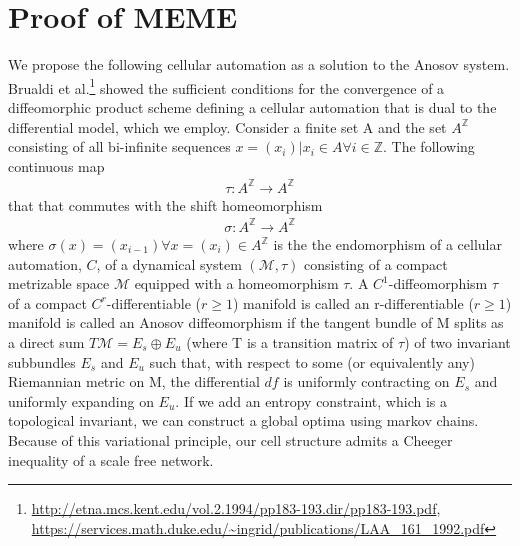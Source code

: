 \documentclass{article}
\begin{document}
\section{Proof of MEME}
We propose the following cellular automation as a solution to the Anosov system. Brualdi et al.\footnote{\url{http://etna.mcs.kent.edu/vol.2.1994/pp183-193.dir/pp183-193.pdf}, \url{https://services.math.duke.edu/~ingrid/publications/LAA_161_1992.pdf}} showed the sufficient conditions for the convergence of a diffeomorphic product scheme defining a cellular automation that is dual to the differential model, which we employ. Consider a finite set A and the set $A^{\mathbb{Z}}$ consisting of all bi-infinite sequences $x = (x_i) | x_i \in A \forall i \in \mathbb{Z}$. The following continuous map
\begin{equation} \label{eq1}
\begin{split}
\tau: A^{\mathbb{Z}} \rightarrow A^{\mathbb{Z}} 
\end{split}
\end{equation}
that that commutes with the shift homeomorphism
\begin{equation} \label{eq1}
\begin{split}
\sigma: A^{\mathbb{Z}} \rightarrow A^{\mathbb{Z}} 
\end{split}
\end{equation}
where $\sigma(x) = (x_{i-1}) \forall x = (x_i) \in A^{\mathbb{Z}}$ is the the endomorphism of a cellular automation, $C$, of a dynamical system $(\mathcal{M}, \tau)$ consisting of a compact metrizable space $\mathcal{M}$ equipped with a homeomorphism $\tau$. A $C^1$-diffeomorphism $\tau$ of a compact $C^r$-differentiable ($r \geq 1$) manifold  is called an r-differentiable ($r \geq 1$) manifold is called an Anosov diffeomorphism if the tangent bundle of M splits as a direct sum $T\mathcal{M} = E_s\oplus E_u$ (where T is a transition matrix of $\tau$) of two invariant subbundles $E_s$ and $E_u$ such that, with respect to some (or equivalently any) Riemannian metric on M, the differential $df$ is uniformly contracting on $E_s$ and uniformly expanding on $E_u$. If we add an entropy constraint, which is a topological invariant, we can construct a global optima using markov chains. Because of this variational principle, our cell structure admits a Cheeger inequality of a scale free network.
\end{document}
